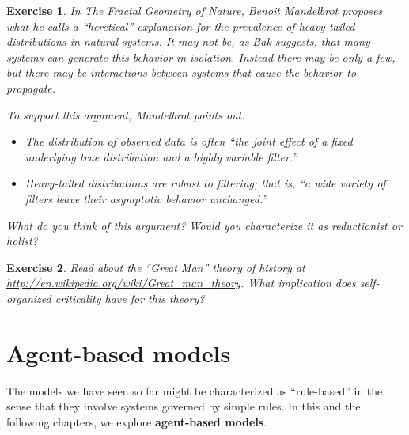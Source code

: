 \documentclass[12pt]{book}
\theoremstyle{exercise}
\newtheorem{exercise}{Exercise}[chapter]
\begin{document}
\begin{exercise}

In {\em The Fractal Geometry of Nature}, Benoit Mandelbrot proposes
what he calls a ``heretical'' explanation for the prevalence of
heavy-tailed distributions in natural systems.  It may not
be, as Bak suggests, that many systems can generate this behavior in
isolation.  Instead there may be only a few, but there may be
interactions between systems that cause the behavior to propagate.


To support this argument, Mandelbrot points out:

\begin{itemize}

\item The distribution of observed data is often ``the joint
  effect of a fixed underlying {\em true distribution} and a highly
  variable {\em filter}.''

\item Heavy-tailed distributions are robust to filtering; that is,
  ``a wide variety of filters leave their asymptotic behavior
  unchanged.''

\end{itemize}

What do you think of this argument?  Would you characterize
it as reductionist or holist?

\end{exercise}


\begin{exercise}

Read about the ``Great Man'' theory of history at
\url{http://en.wikipedia.org/wiki/Great_man_theory}.  What implication
does self-organized criticality have for this theory?

\end{exercise}



\chapter{Agent-based models}
\label{agent-based}

The models we have seen so far might be characterized as ``rule-based''
in the sense that they involve systems governed by simple rules.  In this
and the following chapters, we explore {\bf agent-based models}.

\end{document}
